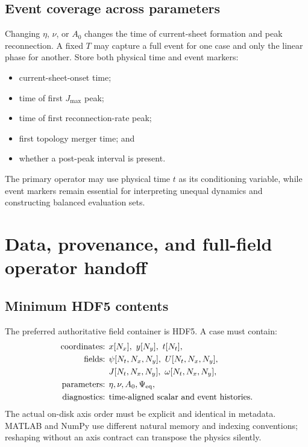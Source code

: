 \documentclass[11pt]{article}
\begin{document}
\subsection{Event coverage across parameters}

Changing $\eta$, $\nu$, or $A_0$ changes the time of current-sheet formation and peak reconnection. A fixed $T$ may capture a full event for one case and only the linear phase for another. Store both physical time and event markers:
\begin{itemize}
  \item current-sheet-onset time;
  \item time of first $J_{\max}$ peak;
  \item time of first reconnection-rate peak;
  \item first topology merger time; and
  \item whether a post-peak interval is present.
\end{itemize}
The primary operator may use physical time $t$ as its conditioning variable, while event markers remain essential for interpreting unequal dynamics and constructing balanced evaluation sets.

\section{Data, provenance, and full-field operator handoff}
\label{sec:handoff}

\subsection{Minimum HDF5 contents}

The preferred authoritative field container is HDF5. A case must contain:
\begin{align}
\text{coordinates: }&x[N_x],\ y[N_y],\ t[N_t],\\
\text{fields: }&\psi[N_t,N_x,N_y],\
U[N_t,N_x,N_y],\\
&J[N_t,N_x,N_y],\
\omega[N_t,N_x,N_y],\\
\text{parameters: }&\eta,\nu,A_0,\Psi_{\rm eq},\\
\text{diagnostics: }&\text{time-aligned scalar and event histories}.
\end{align}
The actual on-disk axis order must be explicit and identical in metadata. MATLAB and NumPy use different natural memory and indexing conventions; reshaping without an axis contract can transpose the physics silently.
\end{document}
